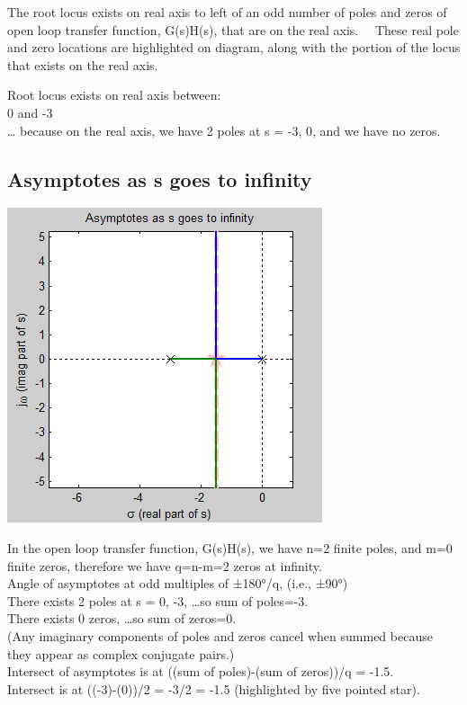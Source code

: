 \documentclass[16pt]{article}
\begin{document}
The root locus exists on real axis to left of an odd number of poles and
zeros of open loop transfer function, G(s)H(s), that are on the real
axis.~~ These real pole and zero locations are highlighted on diagram,
along with the portion of the locus that exists on the real axis.

Root locus exists on real axis between:\\
0 and -3\\[2\baselineskip]\ldots{} because on the real axis, we have 2
poles at s = -3, 0, and we have no zeros.\\

\subsection[Asymptotes as \textbar{}s\textbar{} goes to
infinity]{\texorpdfstring{\protect\hypertarget{RuleInf}{}{}Asymptotes as
\textbar{}s\textbar{} goes to
infinity}{Asymptotes as \textbar{}s\textbar{} goes to infinity}}\label{asymptotes-as-s-goes-to-infinity}

\includegraphics{./Root Locus_ Example 1_files/RLAsymptotes.png}

In the open loop transfer function, G(s)H(s), we have n=2 finite poles,
and m=0 finite zeros, therefore we have q=n-m=2 zeros at
infinity.\\[2\baselineskip]Angle of asymptotes at odd multiples of
±180°/q, (i.e., ±90°)\\[2\baselineskip]There exists 2 poles at s = 0,
-3, \ldots{}so sum of poles=-3.\\
There exists 0 zeros, \ldots{}so sum of zeros=0.\\
(Any imaginary components of poles and zeros cancel when summed because
they appear as complex conjugate pairs.)\\[2\baselineskip]Intersect of
asymptotes is at ((sum of poles)-(sum of zeros))/q = -1.5.\\
Intersect is at ((-3)-(0))/2 = -3/2 = -1.5 (highlighted by five pointed
star).\\
\end{document}

